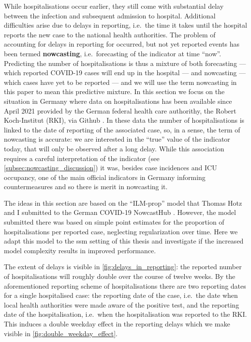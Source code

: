 While hospitalisations occur earlier, they still come with substantial delay between the infection and subsequent admission to hospital. Additional difficulties arise due to delays in reporting, i.e.~the time it takes until the hospital reports the new case to the national health authorities. The problem of accounting for delays in reporting for occurred, but not yet reported events has been termed \textbf{nowcasting}, i.e.~forecasting of the indicator at time ``now''. Predicting the number of hospitalisations is thus a mixture of both forecasting --- which reported COVID-19 cases will end up in the hospital --- and nowcasting --- which cases have yet to be reported --- and we will use the term nowcasting in this paper to mean this predictive mixture. In this section we focus on the situation in Germany where data on hospitalisations has been available since April 2021 provided by the German federal health care authorithy, the Robert Koch-Institut (RKI), via Github \cite{RobertKoch-Institut2021COVID19Hospitalisierungen}. In these data the number of hospitalisations is linked to the date of reporting of the associated case, so, in a sense, the term of nowcasting is accurate: we are interested in the ``true'' value of the indicator today, that will only be observed after a long delay. While this association requires a careful interpretation of the indicator (see \cref{subsec:nowcasting_discussion}) it was, besides case incidences and ICU occupancy, one of the main official indicators in Germany informing countermeasures and so there is merit in nowcasting it. 

The ideas in this section are based on the ``ILM-prop'' model that Thomas Hotz and I submitted to the German COVID-19 NowcastHub . However, the model submitted there was based on simple point estimates for the proportion of hospitalisations per reported case, neglecting regularization over time. Here we adapt this model to the \gls{ssm} setting of this thesis and investigate if the increased model complexity results in improved performance.

The extent of delays is visible in \cref{fig:delays_in_reporting}:
the reported number of hospitalisations will roughly double over the
course of twelve weeks. By the aforementioned reporting scheme of
hospitalisations there are two reporting dates for a single hospitalised
case: the reporting date of the case, i.e.~the date when local health
authorities were made aware of the positive test, and the reporting date
of the hospitalisation, i.e.~when the hospitalisation was reported to
the RKI. This induces a double weekday effect in the reporting delays
which we make visible in \cref{fig:double_weekday_effect}.

